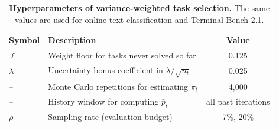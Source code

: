 \begin{table}[t]
\centering
\caption{\textbf{Hyperparameters of variance-weighted task selection.} The same
values are used for online text classification and Terminal-Bench 2.1.}
\label{table:vws_hparams}
\small
\setlength{\tabcolsep}{6pt}
\begin{tabular}{llc}
\toprule
\textbf{Symbol} & \textbf{Description} & \textbf{Value} \\
\midrule
$\ell$ & Weight floor for tasks never solved so far & 0.125 \\
$\lambda$ & Uncertainty bonus coefficient in $\lambda/\sqrt{n_t}$ & 0.025 \\
-- & Monte Carlo repetitions for estimating $\pi_t$ & 4{,}000 \\
-- & History window for computing $\bar{p}_t$ & all past iterations \\
$\rho$ & Sampling rate (evaluation budget) & 7\%, 20\% \\
\bottomrule
\end{tabular}
\end{table}